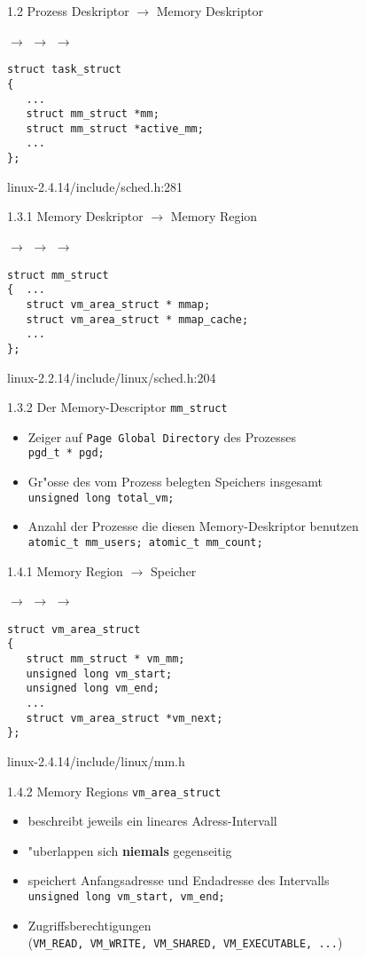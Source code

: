 \documentclass[landscape]{slides}
\begin{document}
%
%
%
\begin{slide}{1.2 Prozess Deskriptor $\to$ Memory Deskriptor}

 $\to$  $\to$  $\to$ 
\begin{verbatim}
struct task_struct
{  
   ...
   struct mm_struct *mm;
   struct mm_struct *active_mm;
   ...
};
\end{verbatim}
linux-2.4.14/include/sched.h:281
\end{slide}
%
%
%
\begin{slide}{1.3.1 Memory Deskriptor $\to$ Memory Region}

 $\to$  $\to$  $\to$ 
\begin{verbatim}
struct mm_struct
{  ...
   struct vm_area_struct * mmap;
   struct vm_area_struct * mmap_cache;
   ...
};
\end{verbatim}
linux-2.2.14/include/linux/sched.h:204
\end{slide}
%
\begin{slide}{1.3.2 Der Memory-Descriptor \texttt{mm\_struct}}
\begin{itemize}
\item Zeiger auf \texttt{Page Global Directory} des Prozesses\\
\texttt{pgd\_t * pgd;}
\item Gr"osse des vom Prozess belegten Speichers insgesamt\\
\texttt{unsigned long total\_vm;}
\item Anzahl der Prozesse die diesen Memory-Deskriptor benutzen\\
\texttt{atomic\_t mm\_users; atomic\_t mm\_count;}
\end{itemize}
\end{slide}
%
%
%
\begin{slide}{1.4.1 Memory Region $\to$ Speicher}

 $\to$  $\to$  $\to$ 
\begin{verbatim}
struct vm_area_struct
{
   struct mm_struct * vm_mm;	
   unsigned long vm_start;	
   unsigned long vm_end;
   ...
   struct vm_area_struct *vm_next;
};
\end{verbatim}
linux-2.4.14/include/linux/mm.h
\end{slide}
%
\begin{slide}{1.4.2 Memory Regions \texttt{vm\_area\_struct}}
\begin{itemize}
\item beschreibt jeweils ein lineares Adress-Intervall
\item "uberlappen sich \textbf{niemals} gegenseitig
\item speichert Anfangsadresse und Endadresse des Intervalls\\
		  \texttt{unsigned long vm\_start, vm\_end;}
\item Zugriffsberechtigungen\\ (\texttt{VM\_READ, VM\_WRITE, VM\_SHARED, VM\_EXECUTABLE, ...})
\end{itemize}
\end{slide}
\end{document}
